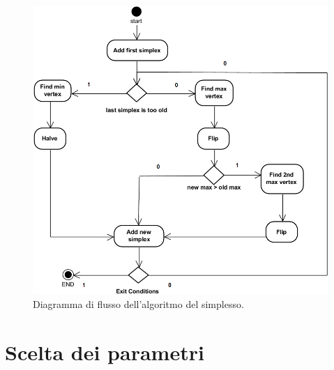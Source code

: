\documentclass[a4paper, 11pt]{article}
\begin{document}
\begin{figure}[H]
	\centering
 	\includegraphics[width=14cm]{assets/figure3}
 	\caption{Diagramma di flusso dell'algoritmo del simplesso.}
\end{figure}
\noindent

\section*{Scelta dei parametri}
\end{document}
